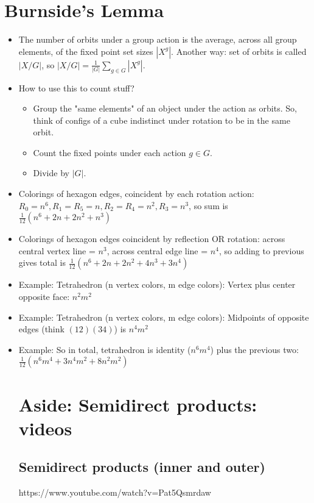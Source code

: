 \documentclass[11pt, oneside]{article}   	%
\begin{document}
\section{Burnside's Lemma}
\begin{itemize}
\item The number of orbits under a group action is the average, across all group elements, of the fixed point set sizes $|X^g|$.  Another way: set of orbits is called $|X / G|$, so $|X /G| = \frac{1}{|G|}\sum_{g \in G}|X^g|$.
\item How to use this to count stuff?  
  \begin{itemize}
  \item Group the "same elements" of an object under the action as orbits.  So, think of configs of a cube indistinct under rotation to be in the same orbit.
  \item Count the fixed points under each action $g \in G$.  
  \item Divide by $|G|$.
  \end{itemize}
  \item Colorings of hexagon edges, coincident by each rotation action: $R_0 = n^6, R_1 = R_5 = n, R_2 = R_4 = n^2, R_3 = n^3$, so sum is $\frac{1}{12}(n^6 + 2n + 2n^2 + n^3)$
  \item Colorings of hexagon edges coincident by reflection OR rotation: across central vertex line = $n^3$, across central edge line = $n^4$, so adding to previous gives total is $\frac{1}{12}(n^6 + 2n + 2n^2 + 4n^3 + 3n^4)$
 \item Example: Tetrahedron (n vertex colors, m edge colors): Vertex plus center opposite face: $n^2m^2$
 \item Example: Tetrahedron (n vertex colors, m edge colors): Midpoints of opposite edges (think $(12)(34)$) is $n^4m^2$
 \item Example: So in total, tetrahedron is identity ($n^6m^4$) plus the previous two: $\frac{1}{12}(n^6m^4 + 3n^4m^2 + 8n^2m^2)$
 
 \section{Aside: Semidirect products: videos}
 \subsection{Semidirect products (inner and outer)}
 https://www.youtube.com/watch?v=Pat5Qsmrdaw
 

\end{itemize}
\end{document}
